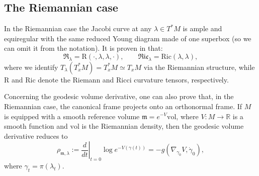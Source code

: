 \documentclass[11pt,a4paper]{article}
\theoremstyle{plain}
\theoremstyle{definition}
\theoremstyle{remark}
\numberwithin{equation}{section}
\newcommand{\R}{\mathbb{R}} %
\newcommand{\mm}{\mathfrak m}
\begin{document}
\subsection{The Riemannian case}
In the Riemannian case the Jacobi curve at any $\lambda \in T^*M$ is ample and equiregular with the same reduced Young diagram made of one superbox (so we can omit it from the notation). It is proven in \cite[Lemma 15]{BR-comparison} that:
\begin{equation}
\mathfrak{R}_{\lambda} = \mathrm{R}(\cdot,\lambda,\lambda,\cdot), \qquad \mathfrak{Ric}_{\lambda} = \mathrm{Ric}(\lambda,\lambda),
\end{equation}
where we identify $T_\lambda(T^*_xM) = T^*_x M \simeq T_x M$ via the Riemannian structure, while $\mathrm{R}$ and $\mathrm{Ric}$ denote the Riemann and Ricci curvature tensors, respectively.

Concerning the geodesic volume derivative, one can also prove that, in the Riemannian case, the canonical frame projects onto an orthonormal frame. If $M$ is equipped with a smooth reference volume $\mm = e^{-V}\mathrm{vol}$, where $V:M \to \R$ is a smooth function and $\mathrm{vol}$ is the Riemannian density, then the geodesic volume derivative reduces to
\begin{equation}
\rho_{\mm,\lambda} := \left.\frac{d}{dt}\right|_{t=0}\log e^{-V(\gamma(t))}=-g(\nabla_{\gamma_0} V, \dot \gamma_0),
\end{equation}
where $\gamma_t = \pi(\lambda_t)$.



\end{document}
